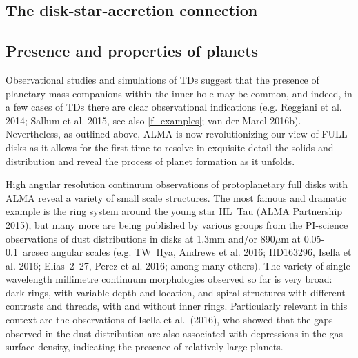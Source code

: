 \documentclass[10pt,fleqn,twoside]{article}
\begin{document}
\subsection{The disk-star-accretion connection}


\subsection{Presence and properties of planets}

Observational studies and simulations of TDs suggest that the presence of planetary-mass companions within the inner hole may be common, and indeed, in a few cases of TDs there are clear observational indications (e.g. Reggiani et al. 2014; Sallum et al. 2015, see also \ref{f_examples}; van der Marel 2016b).
Nevertheless, 
as outlined above, ALMA is now revolutionizing our view of FULL disks as it allows for the first time to resolve in exquisite detail the solids and distribution and reveal the process of planet formation as it unfolds.

High angular resolution continuum observations of protoplanetary full disks with ALMA reveal a variety of small scale structures. The most famous and dramatic example is the ring system around the young star HL~Tau (ALMA Partnership 2015), but many more are being published by various groups from the PI-science observations of dust distributions in disks at 1.3mm and/or 890$\mu$m at 0.05-0.1~arcsec angular scales (e.g. TW~Hya, Andrews et al. 2016; HD163296, Isella et al. 2016; Elias~2--27, Perez et al. 2016; among many others). The variety of single wavelength millimetre continuum morphologies observed so far is very broad: dark rings, with variable depth and location, and spiral structures with different contrasts and threads, with and without inner rings. Particularly relevant in this context are the observations of Isella et al.~(2016), who showed that the gaps observed in the dust distribution are also associated with depressions in the gas surface density, indicating the presence of relatively large planets.
\end{document}
